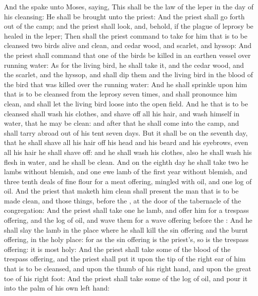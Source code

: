 \begin{biblechapter} %
 And the \LORD spake unto Moses, saying,
\verse This shall be the law of the leper in the day of his cleansing: He shall be brought unto the priest:
\verse And the priest shall go forth out of the camp; and the priest shall look, and, behold, if the plague of leprosy be healed in the leper;
\verse Then shall the priest command to take for him that is to be cleansed two birds alive and clean, and cedar wood, and scarlet, and hyssop:
\verse And the priest shall command that one of the birds be killed in an earthen vessel over running water:
\verse As for the living bird, he shall take it, and the cedar wood, and the scarlet, and the hyssop, and shall dip them and the living bird in the blood of the bird that was killed over the running water:
\verse And he shall sprinkle upon him that is to be cleansed from the leprosy seven times, and shall pronounce him clean, and shall let the living bird loose into the open field.
\verse And he that is to be cleansed shall wash his clothes, and shave off all his hair, and wash himself in water, that he may be clean: and after that he shall come into the camp, and shall tarry abroad out of his tent seven days.
\verse But it shall be on the seventh day, that he shall shave all his hair off his head and his beard and his eyebrows, even all his hair he shall shave off: and he shall wash his clothes, also he shall wash his flesh in water, and he shall be clean.
\verse And on the eighth day he shall take two he lambs without blemish, and one ewe lamb of the first year without blemish, and three tenth deals of fine flour for a meat offering, mingled with oil, and one log of oil.
\verse And the priest that maketh him clean shall present the man that is to be made clean, and those things, before the \LORD, at the door of the tabernacle of the congregation:
\verse And the priest shall take one he lamb, and offer him for a trespass offering, and the log of oil, and wave them for a wave offering before the \LORD:
\verse And he shall slay the lamb in the place where he shall kill the sin offering and the burnt offering, in the holy place: for as the sin offering is the priest's, so is the trespass offering: it is most holy:
\verse And the priest shall take some of the blood of the trespass offering, and the priest shall put it upon the tip of the right ear of him that is to be cleansed, and upon the thumb of his right hand, and upon the great toe of his right foot:
\verse And the priest shall take some of the log of oil, and pour it into the palm of his own left hand:

\end{biblechapter}
